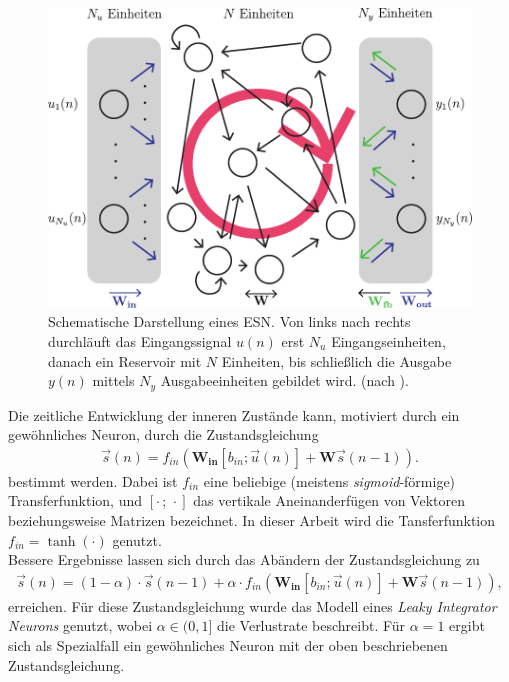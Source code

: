 \begin{figure}[h]
    \centering
    \includegraphics[width = 0.7 \textwidth]{figures/illustrations/esn_structure.pdf}
    \caption{Schematische Darstellung eines \textsc{ESN}. Von links nach rechts durchläuft das Eingangssignal $u(n)$ erst $N_u$ Eingangseinheiten, danach ein Reservoir mit $N$ Einheiten, bis schließlich die Ausgabe $y(n)$ mittels $N_y$ Ausgabeeinheiten gebildet wird. (nach \citep{jeagerTut2002, Ma2013}).}
    \label{fig:esn_structure}
\end{figure}


Die zeitliche Entwicklung der inneren Zustände kann, motiviert durch ein gewöhnliches Neuron, durch die Zustandsgleichung
\begin{align}
\vec{s}(n) = f_{in}\left( \mathbf{W_{in}} [b_{in}; \vec{u}(n)] + \mathbf{W} \vec{s}(n-1) \right).
\end{align}
bestimmt werden. Dabei ist $f_{in}$ eine beliebige (meistens \textit{sigmoid}-förmige) Transferfunktion, und $[\cdot\,;\,\cdot]$ das vertikale Aneinanderfügen von Vektoren beziehungsweise Matrizen bezeichnet. In dieser Arbeit wird die Tansferfunktion $f_{in} = \tanh(\cdot)$ genutzt.\\

Bessere Ergebnisse lassen sich durch das Abändern der Zustandsgleichung zu
\begin{align}
\label{eq:esn_stateeq}
\vec{s}(n) = (1 - \alpha) \cdot \vec{s}(n-1)  + \alpha \cdot f_{in}\left( \mathbf{W_{in}} [b_{in}; \vec{u}(n)] + \mathbf{W} \vec{s}(n-1) \right),
\end{align}
erreichen. Für diese Zustandsgleichung wurde das Modell eines \textit{Leaky Integrator Neurons} genutzt, wobei $\alpha \in (0,1]$ die Verlustrate beschreibt. Für $\alpha=1$ ergibt sich als Spezialfall ein gewöhnliches Neuron mit der oben beschriebenen Zustandsgleichung.\\

